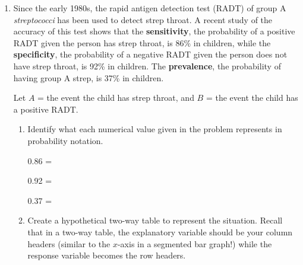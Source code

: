 \documentclass[
]{report}
\begin{document}
\begin{enumerate}
\def\labelenumi{\arabic{enumi}.}
\setcounter{enumi}{4}
\item
  Since the early 1980s, the rapid antigen detection test (RADT) of group A \emph{streptococci} has been used to detect strep throat. A recent study of the accuracy of this test shows that the \textbf{sensitivity}, the probability of a positive RADT given the person has strep throat, is 86\% in children, while the \textbf{specificity}, the probability of a negative RADT given the person does not have strep throat, is 92\% in children. The \textbf{prevalence}, the probability of having group A strep, is 37\% in children.
  \vspace{1mm}

  Let \(A\) = the event the child has strep throat, and \(B\) = the event the child has a positive RADT.
  \vspace{0.1in}

  \begin{enumerate}
  \def\labelenumii{\alph{enumii}.}
  \item
    Identify what each numerical value given in the problem represents in probability notation.
    \vspace{.1in}

    0.86 =\\
    \vspace{.1in}

    0.92 =\\
    \vspace{.1in}

    0.37 =\\
    \vspace{.1in}
  \item
    Create a hypothetical two-way table to represent the situation. Recall that in a two-way table, the explanatory variable should be your column headers (similar to the \(x\)-axis in a segmented bar graph!) while the response variable becomes the row headers.


\end{enumerate}
\end{enumerate}
\end{document}
